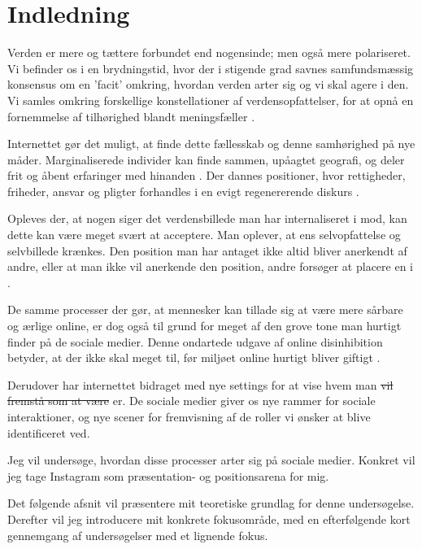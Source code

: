 \section{Indledning} 

Verden er mere og tættere forbundet end nogensinde; men også mere
polariseret. Vi befinder os i en brydningstid, hvor der i
stigende grad savnes samfundsmæssig konsensus om en 'facit'
omkring, hvordan verden arter sig og vi skal agere i den. Vi
samles omkring forskellige konstellationer af verdensopfattelser,
for at opnå en fornemmelse af tilhørighed blandt
meningsfæller \autocite{sulerUniqueGroupsCyberspace1999}.

Internettet gør det muligt, at finde dette fællesskab og denne
samhørighed på nye måder. Marginaliserede individer kan finde
sammen, upåagtet geografi, og deler frit og åbent erfaringer med
hinanden \autocite[s. 184]{sulerOnlineDisinhibitionEffect2004}. 
Der dannes positioner, hvor rettigheder, friheder, ansvar og
pligter forhandles i en evigt regenererende diskurs \autocite[s.
22]{harrePositioningTheoryMoral1999}.

Opleves der, at nogen siger det verdensbillede man har
internaliseret i mod, kan dette kan være meget svært at acceptere.
Man oplever, at ens selvopfattelse og selvbillede krænkes. Den
position man har antaget ikke altid bliver anerkendt af andre,
eller at man ikke vil anerkende den position, andre forsøger at
placere en i \autocite[s30]{harrePositioningTheoryMoral1999}.

De samme processer der gør, at mennesker kan tillade sig at være
mere sårbare og ærlige online, er dog også til grund for meget af
den grove tone man hurtigt finder på de sociale medier. Denne 
ondartede udgave af online disinhibition betyder, at der ikke skal
meget til, før miljøet online hurtigt bliver giftigt
\autocite{sulerOnlineDisinhibitionEffect2004}.

Derudover har internettet bidraget med nye settings for at vise 
hvem man \sout{vil fremstå som at være} er. De sociale medier 
giver os nye rammer for sociale interaktioner, og nye scener for 
fremvisning af de roller vi ønsker at blive identificeret ved.

Jeg vil undersøge, hvordan disse processer arter sig på sociale
medier. Konkret vil jeg tage Instagram som præsentation- og
positionsarena for mig.

Det følgende afsnit vil præsentere mit teoretiske grundlag for
denne undersøgelse. Derefter vil jeg introducere mit konkrete
fokusområde, med en efterfølgende kort gennemgang af undersøgelser
med et lignende fokus.

